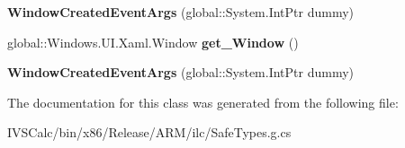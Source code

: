 \begin{DoxyCompactItemize}
\item 
\mbox{\label{class_windows_1_1_u_i_1_1_xaml_1_1_window_created_event_args_a4d91513082c364adeb85991c266e4728}} 
{\bfseries Window\+Created\+Event\+Args} (global\+::\+System.\+Int\+Ptr dummy)
\item 
\mbox{\label{class_windows_1_1_u_i_1_1_xaml_1_1_window_created_event_args_ac7ddcc90a585fa511fa5332dc63a1141}} 
global\+::\+Windows.\+U\+I.\+Xaml.\+Window {\bfseries get\+\_\+\+Window} ()
\item 
\mbox{\label{class_windows_1_1_u_i_1_1_xaml_1_1_window_created_event_args_a4d91513082c364adeb85991c266e4728}} 
{\bfseries Window\+Created\+Event\+Args} (global\+::\+System.\+Int\+Ptr dummy)
\end{DoxyCompactItemize}


The documentation for this class was generated from the following file\+:\begin{DoxyCompactItemize}
\item 
I\+V\+S\+Calc/bin/x86/\+Release/\+A\+R\+M/ilc/Safe\+Types.\+g.\+cs\end{DoxyCompactItemize}
